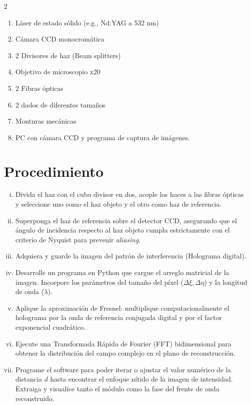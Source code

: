 \documentclass[letterpaper]{article}
\begin{document}
\begin{multicols}{2}
		\begin{enumerate}
			\item Láser de estado sólido (e.g., Nd:YAG a 532 nm)
			\item Cámara CCD monocromática
			\item 2 Divisores de haz (Beam splitters)
			\item Objetivo de microscopio x20
			\item 2 Fibras ópticas
			\item 2 dados de diferentes tamaños
			\item Monturas mecánicas
			\item PC con cámara CCD y programa de captura de imágenes.
		\end{enumerate}
		
		\section*{Procedimiento}
		
		\begin{enumerate}[i)]
			\item Divida el haz con el cubo divisor en dos, acople los haces a las fibras ópticas y seleccione uno como el haz objeto y el otro como haz de referencia.
			\item Superponga el haz de referencia sobre el detector CCD, asegurando que el ángulo de incidencia respecto al haz objeto cumpla estrictamente con el criterio de Nyquist para prevenir \textit{aliasing}.
			\item Adquiera y guarde la imagen del patrón de interferencia (Holograma digital).
			\item Desarrolle un programa en Python que cargue el arreglo matricial de la imagen. Incorpore los parámetros del tamaño del píxel ($\Delta\xi, \Delta\eta$) y la longitud de onda ($\lambda$).
			\item Aplique la aproximación de Fresnel: multiplique computacionalmente el holograma por la onda de referencia conjugada digital y por el factor exponencial cuadrático.
			\item Ejecute una Transformada Rápida de Fourier (FFT) bidimensional para obtener la distribución del campo complejo en el plano de reconstrucción.
			\item Programe el software para poder iterar o ajustar el valor numérico de la distancia $d$ hasta encontrar el enfoque nítido de la imagen de intensidad. Extraiga y visualice tanto el módulo como la fase del frente de onda reconstruido.
		\end{enumerate}
		

\end{multicols}
\end{document}

